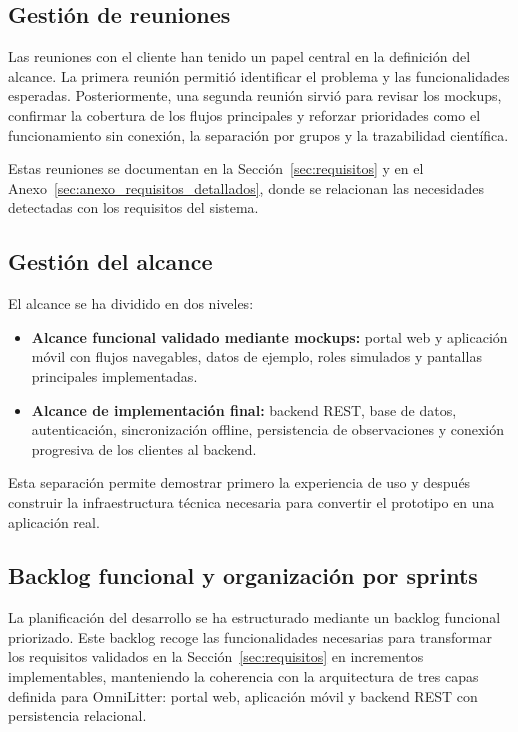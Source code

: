 \subsection{Gestión de reuniones}

Las reuniones con el cliente han tenido un papel central en la definición del
alcance. La primera reunión permitió identificar el problema y las funcionalidades
esperadas. Posteriormente, una segunda reunión sirvió para revisar los mockups,
confirmar la cobertura de los flujos principales y reforzar prioridades como el
funcionamiento sin conexión, la separación por grupos y la trazabilidad científica.

Estas reuniones se documentan en la Sección~\ref{sec:requisitos} y en el Anexo~\ref{sec:anexo_requisitos_detallados},
donde se relacionan las necesidades detectadas con los requisitos del sistema.

\subsection{Gestión del alcance}

El alcance se ha dividido en dos niveles:

\begin{itemize}
  \item \textbf{Alcance funcional validado mediante mockups:} portal web y aplicación
    móvil con flujos navegables, datos de ejemplo, roles simulados y pantallas
    principales implementadas.
  \item \textbf{Alcance de implementación final:} backend REST, base de datos,
    autenticación, sincronización offline, persistencia de observaciones y conexión
    progresiva de los clientes al backend.
\end{itemize}

Esta separación permite demostrar primero la experiencia de uso y después construir
la infraestructura técnica necesaria para convertir el prototipo en una aplicación
real.

\subsection{Backlog funcional y organización por sprints}

La planificación del desarrollo se ha estructurado mediante un backlog funcional
priorizado. Este backlog recoge las funcionalidades necesarias para transformar los
requisitos validados en la Sección~\ref{sec:requisitos} en incrementos implementables,
manteniendo la coherencia con la arquitectura de tres capas definida para OmniLitter:
portal web, aplicación móvil y backend REST con persistencia relacional.

